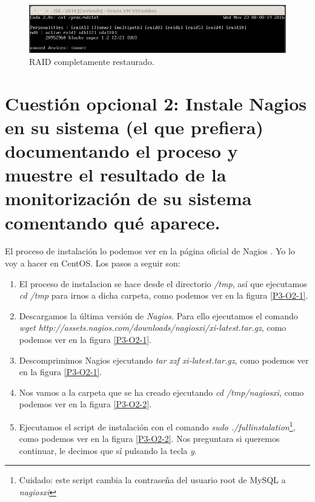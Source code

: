 \documentclass[a4paper,titlepage,12pt]{report}	%
\numberwithin{figure}{section} %
\numberwithin{table}{section} %
\begin{document}
	\begin{figure}[H]
	   \includegraphics[width=\linewidth]{./Imagenes/P3/O1-5.png}
	   \vspace{-0.5cm}
	   \caption[RAID completamente restaurado.]{RAID completamente restaurado.}
	   \label{P3-O1-5}
	\end{figure}

	\section[Cuestión opcional 2: Instale Nagios en su sistema (el que prefiera) documentando el proceso y muestre el resultado de la monitorización de su sistema comentando qué aparece.]{Cuestión opcional 2: Instale Nagios en su sistema (el que prefiera) documentando el proceso y muestre el resultado de la monitorización de su sistema comentando qué aparece.}

	El proceso de instalación lo podemos ver en la página oficial de Nagios \cite{nagios}. Yo lo voy a hacer en CentOS. Los pasos a seguir son:

	\begin{enumerate}
	   \item El proceso de instalacion se hace desde el directorio \textit{/tmp}, así que ejecutamos \textit{cd /tmp} para irnos a dicha carpeta, como podemos ver en la figura \ref{P3-O2-1}.
	   \item Descargamos la última versión de \textit{Nagios}. Para ello ejecutamos el comando \textit{wget http://assets.nagios.com/downloads/nagiosxi/xi-latest.tar.gz}, como podemos ver en la figura \ref{P3-O2-1}.
	   \item Descomprimimos Nagios ejecutando \textit{tar xzf xi-latest.tar.gz}, como podemos ver en la figura \ref{P3-O2-1}.
	   \item Nos vamos a la carpeta que se ha creado ejecutando \textit{cd /tmp/nagiosxi}, como podemos ver en la figura \ref{P3-O2-2}.
	   \item Ejecutamos el script de instalación con el comando \textit{sudo ./fullinstalation}\footnote{Cuidado: este script cambia la contraseña del usuario root de MySQL a \textit{nagiosxi}}, como podemos ver en la figura \ref{P3-O2-2}. Nos preguntara si queremos continuar, le decimos que sí pulsando la tecla \textit{y}.
	\end{enumerate}
\end{document}
